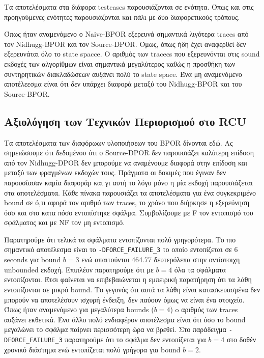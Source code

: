 Τα αποτελέσματα στα διάφορα testcases παρουσιάζονται σε ενότητα. Όπως και στις προηγούμενες ενότητες παρουσιάζονται και πάλι με δύο διαφορετικούς
τρόπους.


Όπως ήταν αναμενόμενο ο Naive-BPOR εξερευνά σημαντικά λιγότερα traces από τον Nidhugg-BPOR και τον Source-DPOR. Όμως, όπως ήδη έχει αναφερθεί 
δεν εξερευνάται όλο το state spacce. Ο αριθμός των tracecs που εξερευνόνται στις sound εκδοχές των αλγορίθμων είναι σημαντικά μεγαλύτερος καθώς
η προσθήκη των συντηρητικών διακλαδώσεων αυξάνει πολύ το state space.
Ένα μη αναμενόμενο αποτέλεεσμα είναι ότι δεν υπάρχει διαφορά μεταξύ του Nidhugg-BPOR και του Source-BPOR.

\subsection{Αξιολόγηση των Τεχνικών Περιορισμού στο RCU}
Τα αποτελέσματα των διαφόρωων υλοποιήσεων του BPOR δίνονται εδώ. Ας σημειώσουμε ότι δεδομένου ότι ο Source-DPOR δεν παρουσιάζει καλύτερη επίδοση
από τον Nidhugg-DPOR δεν μπορούμε να αναμένουμε διαφορά στην επίδοση και μεταξύ των φραγμένων εκδοχών τους. Πράγματα οι δοκιμές που έγιναν
δεν παρουσίασαν καμία διαφοράρ και γι αυτή το λόγο μόνο η μία εκδοχή παρουσιάζεται στα αποτελέσματα. Κάθε πίνακα παρουσιάζει τα αποτελέσματα 
για ένα συγκεκριμένο bound σε ό,τι αφορά τον αριθμό των traces, το χρόνο που διήρκησε η εξερεύνηση όσο και στο κατα πόσο εντοπίστηκε σφάλμα.
Συμβολίζουμε με F τον εντοπισμό του σφάλματος και με NF τον μη εντοπισμό.



Παρατηρούμε ότι τελικά τα σφάλματα εντοπίζονται πολύ γρηγορότερα. Το πιο σημαντικό αποτέλεσμα είναι το
\verb|-DFORCE_FAILURE_3| το οποίο εντοπίζεται σε 6 seconds για bound $b=3$ ενώ απαιτούνται 464.77 δευτερόλεπα στην αντίστοιχη unbounded εκδοχή.
Επιπλέον παρατηρούμε ότι με $b=4$ όλα τα σφάλματα εντοπίζονται. Έτσι φαίνεται να επιβεβαιώνεται η εμπειρική 
παρατήρηση ότι τα λάθη εντοπίζονται σε μικρό bound. Το γεγονός ότι αυτά τα λάθη είναι κατασκευασμένα δεν μπορούν 
να αποτελέσουν ισχυρή ένδειξη, δεν παύουν όμως να είναι ένα στοιχείο.
Όπως ήταν αναμενόμενο για μεγαλύτερα bounds ($b=4$) o αριθμός των traces αυξάνει εκθετικά.
Ένα άλλο πολύ ενδιαφέρον αποτέλεσμα είναι ότι όσο το bound μεγαλώνει το σφάλμα παίρνει περισσότερη ώρα να βρεθεί. Στο παράδειγμα
\verb|-DFORCE_FAILURE_3| παρατηρούμε ότι το σφάλμα δεν εντοπίζεται για $b=4$ στο δοθέν χρονικό διάστημα ενώ εντοπίζεται πολύ γρήγορα 
για bound $b=2$.


